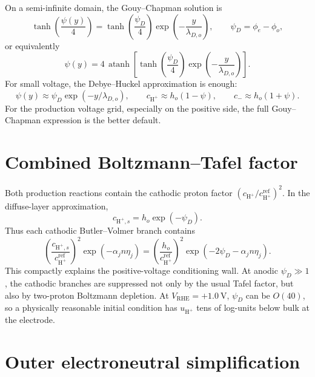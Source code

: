 \documentclass[11pt]{article}
\newcommand{\HH}{\mathrm{H}^{+}}
\begin{document}
On a semi-infinite domain, the Gouy--Chapman solution is
\begin{equation}
  \tanh\!\left(\frac{\psi(y)}{4}\right)
  =
  \tanh\!\left(\frac{\psi_D}{4}\right)
  \exp\!\left(-\frac{y}{\lambda_{D,o}}\right),
  \qquad
  \psi_D = \phi_e-\phi_o,
  \label{eq:gouy-chapman-tanh}
\end{equation}
or equivalently
\begin{equation}
  \psi(y)
  =
  4\,\operatorname{atanh}
  \left[
    \tanh\!\left(\frac{\psi_D}{4}\right)
    \exp\!\left(-\frac{y}{\lambda_{D,o}}\right)
  \right].
  \label{eq:gouy-chapman}
\end{equation}
For small voltage, the Debye--Huckel approximation is enough:
\[
  \psi(y) \approx \psi_D\exp(-y/\lambda_{D,o}),
  \qquad
  c_{\HH} \approx h_o(1-\psi),
  \qquad
  c_- \approx h_o(1+\psi).
\]
For the production voltage grid, especially on the positive side, the full
Gouy--Chapman expression is the better default.

\section{Combined Boltzmann--Tafel factor}

Both production reactions contain the cathodic proton factor
\((c_{\HH}/c_{\HH}^{\mathrm{ref}})^2\). In the diffuse-layer approximation,
\[
  c_{\HH,s} = h_o\exp(-\psi_D).
\]
Thus each cathodic Butler--Volmer branch contains
\begin{equation}
  \left(\frac{c_{\HH,s}}{c_{\HH}^{\mathrm{ref}}}\right)^2
  \exp(-\alpha_j n\eta_j)
  =
  \left(\frac{h_o}{c_{\HH}^{\mathrm{ref}}}\right)^2
  \exp(-2\psi_D-\alpha_j n\eta_j).
  \label{eq:boltzmann-tafel}
\end{equation}
This compactly explains the positive-voltage conditioning wall. At anodic
\(\psi_D\gg 1\), the cathodic branches are suppressed not only by the usual
Tafel factor, but also by two-proton Boltzmann depletion. At
\(V_{\mathrm{RHE}}=+1.0~\mathrm{V}\), \(\psi_D\) can be \(O(40)\), so a
physically reasonable initial condition has \(u_{\HH}\) tens of log-units
below bulk at the electrode.

\section{Outer electroneutral simplification}
\end{document}
